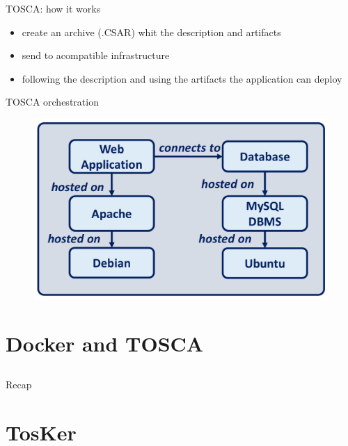 \documentclass{beamer}
\begin{document}
  \begin{frame}{TOSCA: how it works}
    \begin{itemize}
      \item create an archive (.CSAR) whit the description and artifacts
      \item send to acompatible infrastructure
      \item following the description and using the artifacts the application can deploy
    \end{itemize}
  \end{frame}

  \begin{frame}{TOSCA orchestration}
    \begin{figure}
      \includegraphics[width=\textwidth]{img/tosca_deploy.png}
    \end{figure}
  \end{frame}

\section{Docker and TOSCA}\subsection*{}
  \begin{frame}{Recap}

  \end{frame}

\section{TosKer}\subsection*{}
\end{document}
